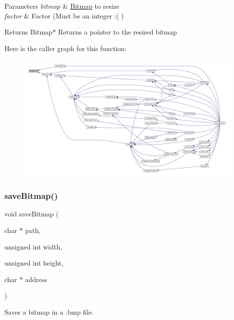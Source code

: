 \begin{DoxyParams}{Parameters}
{\em bitmap} & \mbox{\hyperlink{struct_bitmap}{Bitmap}} to resize \\
\hline
{\em factor} & Factor (Must be an integer \+:( ) \\
\hline
\end{DoxyParams}
\begin{DoxyReturn}{Returns}
Bitmap$\ast$ Returns a pointer to the resized bitmap 
\end{DoxyReturn}
Here is the caller graph for this function\+:\nopagebreak
\begin{figure}[H]
\begin{center}
\leavevmode
\includegraphics[width=350pt]{group__bitmap_gaa19cec779e8cbaf053f3efc749c20c37_icgraph}
\end{center}
\end{figure}
\mbox{\label{group__bitmap_gacc8595ed81c710cecebe95f04db413fe}} 
\subsubsection{\texorpdfstring{save\+Bitmap()}{saveBitmap()}}
{\footnotesize\ttfamily void save\+Bitmap (\begin{DoxyParamCaption}\item[{char $\ast$}]{path,  }\item[{unsigned int}]{width,  }\item[{unsigned int}]{height,  }\item[{char $\ast$}]{address }\end{DoxyParamCaption})}



Saves a bitmap in a .bmp file. 


